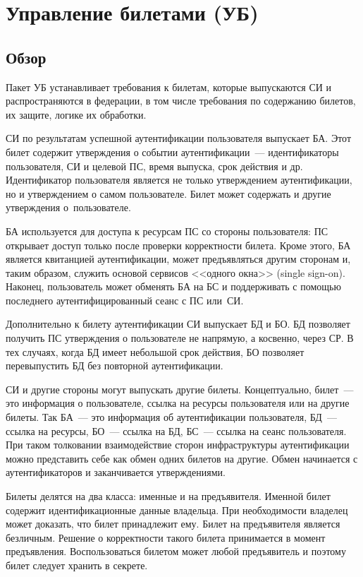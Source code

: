 \section{Управление билетами (УБ)}\label{TM}

\subsection{Обзор}\label{TM.Intro}

Пакет УБ устанавливает требования к билетам, которые выпускаются СИ и 
распространяются в федерации, в том числе требования по содержанию билетов,
их защите, логике их обработки. 

СИ по результатам успешной аутентификации пользователя выпускает БА.
Этот билет содержит утверждения о событии аутентификации~---
идентификаторы пользователя, СИ и целевой ПС, время выпуска, 
срок действия и др.  
%
Идентификатор пользователя является не только утверждением аутентификации,
но и утверждением о самом пользователе.
Билет может содержать и другие утверждения о~пользователе.

БА используется для доступа к ресурсам ПС со стороны пользователя:
ПС открывает доступ только после проверки корректности билета.
%
Кроме этого, БА является квитанцией аутентификации, может предъявляться другим
сторонам и, таким образом,  служить основой сервисов <<одного окна>> (single
sign-on).
%
Наконец, пользователь может обменять БА на БС и поддерживать с помощью 
последнего аутентифицированный сеанс с ПС или~СИ. 

Дополнительно к билету аутентификации СИ выпускает БД и БО.
БД позволяет получить ПС утверждения о пользователе не напрямую,
а косвенно, через СР. В тех случаях, когда БД имеет небольшой срок 
действия, БО позволяет перевыпустить БД без повторной аутентификации. 

СИ и другие стороны могут выпускать другие билеты. 
%
Концептуально, билет~--- это информация о пользователе, 
ссылка на ресурсы пользователя или на другие билеты. 
Так БА~--- это информация об аутентификации пользователя, 
БД~--- ссылка на ресурсы, 
БО~--- ссылка на БД, 
БС~--- ссылка на сеанс пользователя.
%
При таком толковании взаимодействие сторон инфраструктуры аутентификации 
можно представить себе как обмен одних билетов на другие.
%
Обмен начинается с аутентификаторов и заканчивается утверждениями.

Билеты делятся на два класса: именные и на предъявителя.
Именной билет содержит идентификационные данные владельца.
При необходимости владелец может доказать, что билет принадлежит ему.
Билет на предъявителя является безличным. 
Решение о корректности такого билета принимается в момент предъявления.
Воспользоваться билетом может любой предъявитель и поэтому билет 
следует хранить в секрете.

